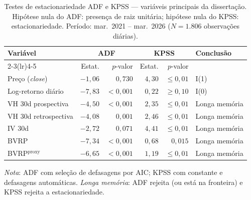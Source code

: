 \begin{table}[H]
\centering
\small
\caption{Testes de estacionariedade ADF e KPSS --- variáveis principais da dissertação. Hipótese nula do ADF: presença de raiz unitária; hipótese nula do KPSS: estacionariedade. Período: mar.\ 2021 -- mar.\ 2026 ($N = 1{.}806$ observações diárias).}
\label{tab:adf_kpss}
\begin{tabular}{lrrrrl}
\toprule
Variável & \multicolumn{2}{c}{ADF} & \multicolumn{2}{c}{KPSS} & Conclusão \\
\cmidrule(lr){2-3}\cmidrule(lr){4-5}
 & Estat. & $p$-valor & Estat. & $p$-valor & \\
\midrule
Preço (\textit{close}) & $-1{,}06$ & $0{,}730$ & $4{,}30$ & ${\leq}0{,}01$ & I(1) \\
Log-retorno diário & $-7{,}83$ & $< 0{,}001$ & $0{,}22$ & ${\geq}0{,}10$ & I(0) \\
VH 30d prospectiva & $-4{,}50$ & $< 0{,}001$ & $2{,}35$ & ${\leq}0{,}01$ & Longa memória \\
VH 30d retrospectiva & $-4{,}08$ & $0{,}001$ & $2{,}46$ & ${\leq}0{,}01$ & Longa memória \\
IV 30d & $-2{,}72$ & $0{,}071$ & $4{,}41$ & ${\leq}0{,}01$ & Longa memória \\
BVRP & $-7{,}34$ & $< 0{,}001$ & $0{,}68$ & $0{,}015$ & Longa memória \\
BVRP$^{\text{proxy}}$ & $-6{,}65$ & $< 0{,}001$ & $1{,}19$ & ${\leq}0{,}01$ & Longa memória \\
\bottomrule
\end{tabular}
\par\smallskip
\footnotesize\textit{Nota}: ADF com seleção de defasagens por AIC; KPSS com constante e defasagens automáticas. \textit{Longa memória}: ADF rejeita (ou está na fronteira) e KPSS rejeita a estacionariedade.
\end{table}
